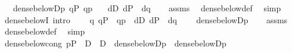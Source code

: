 \begin{isabellebody}
\ \ \ {\isachardoublequoteopen}dense{\isacharunderscore}{\kern0pt}below{\isacharparenleft}{\kern0pt}D{\isacharcomma}{\kern0pt}p{\isacharparenright}{\kern0pt}{\isachardoublequoteclose}\ {\isachardoublequoteopen}q{\isasymin}P{\isachardoublequoteclose}\ {\isachardoublequoteopen}q{\isasympreceq}p{\isachardoublequoteclose}\isanewline
\ \ \ {\isachardoublequoteopen}{\isasymexists}d{\isasymin}D{\isachardot}{\kern0pt}\ d{\isasymin}P\ {\isasymand}\ d{\isasympreceq}q{\isachardoublequoteclose}\isanewline
%
\isadelimproof
\ \ %
\endisadelimproof
%
\isatagproof
{}\isamarkupfalse%
\ assms\ \isamarkupfalse%
\ dense{\isacharunderscore}{\kern0pt}below{\isacharunderscore}{\kern0pt}def\ \isamarkupfalse%
\ simp%
\endisatagproof
{\isafoldproof}%
%
\isadelimproof
\isanewline
%
\endisadelimproof
\ \ \ \ \isanewline
\isanewline
{}\isamarkupfalse%
\ dense{\isacharunderscore}{\kern0pt}belowI\ {\isacharbrackleft}{\kern0pt}intro{\isacharbang}{\kern0pt}{\isacharbrackright}{\kern0pt}{\isacharcolon}{\kern0pt}\ \isanewline
\ \ \ {\isachardoublequoteopen}{\isasymAnd}q{\isachardot}{\kern0pt}\ q{\isasymin}P\ {\isasymLongrightarrow}\ q{\isasympreceq}p\ {\isasymLongrightarrow}\ {\isasymexists}d{\isasymin}D{\isachardot}{\kern0pt}\ d{\isasymin}P\ {\isasymand}\ d{\isasympreceq}q{\isachardoublequoteclose}\ \isanewline
\ \ \ {\isachardoublequoteopen}dense{\isacharunderscore}{\kern0pt}below{\isacharparenleft}{\kern0pt}D{\isacharcomma}{\kern0pt}p{\isacharparenright}{\kern0pt}{\isachardoublequoteclose}\isanewline
%
\isadelimproof
\ \ %
\endisadelimproof
%
\isatagproof
{}\isamarkupfalse%
\ assms\ \isamarkupfalse%
\ dense{\isacharunderscore}{\kern0pt}below{\isacharunderscore}{\kern0pt}def\ \isamarkupfalse%
\ simp%
\endisatagproof
{\isafoldproof}%
%
\isadelimproof
\isanewline
%
\endisadelimproof
\isanewline
{}\isamarkupfalse%
\ dense{\isacharunderscore}{\kern0pt}below{\isacharunderscore}{\kern0pt}cong{\isacharcolon}{\kern0pt}\ {\isachardoublequoteopen}p{\isasymin}P\ {\isasymLongrightarrow}\ D\ {\isacharequal}{\kern0pt}\ D{\isacharprime}{\kern0pt}\ {\isasymLongrightarrow}\ dense{\isacharunderscore}{\kern0pt}below{\isacharparenleft}{\kern0pt}D{\isacharcomma}{\kern0pt}p{\isacharparenright}{\kern0pt}\ {\isasymlongleftrightarrow}\ dense{\isacharunderscore}{\kern0pt}below{\isacharparenleft}{\kern0pt}D{\isacharprime}{\kern0pt}{\isacharcomma}{\kern0pt}p{\isacharparenright}{\kern0pt}{\isachardoublequoteclose}\isanewline

\end{isabellebody}
